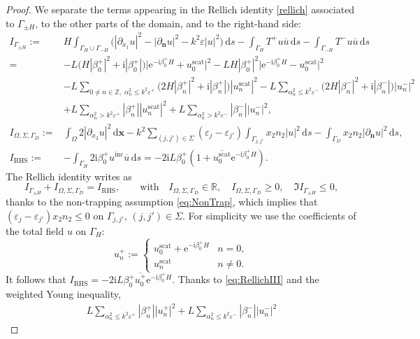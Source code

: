 \documentclass[10pt,a4paper]{amsart}
\newcommand{\IR}{{\mathbb R}}
\newcommand{\IZ}{{\mathbb Z}}
\newcommand{\bx}{{\mathbf x}}
\newcommand{\bn}{{\mathbf n}}
\newcommand{\ri}{{\mathrm i}}
\newcommand{\re}{{\mathrm e}}
\newcommand{\rd}{{\,\mathrm d}}
\newcommand{\inc}{{\mathrm{inc}}}
\newcommand{\scat}{{\mathrm{scat}}}
\newcommand{\dn}{{\partial_\bn}}
\newcommand{\dxo}{{\partial_{x_1}}}
\newcommand{\dxt}{{\partial_{x_2}}}
\newcommand{\cu}{{\overline{u}}}
\newcommand{\GD}{{\Gamma_D}}
\newcommand{\GH}{{\Gamma_H}}
\newcommand{\GmH}{{\Gamma_{-H}}}
\newcommand{\GpmH}{{\Gamma_{\pm H}}}
\begin{document}
\begin{proof}
We separate the terms appearing in the Rellich identity \eqref{rellich} associated to $\GpmH$, to the other parts of the domain, and to the right-hand side:
\begin{align*} \nonumber
	I_\GpmH := & H\int_{\GH\cup\GmH} \biggl( \left|\dxo u \right|^2 - \left| \dn u \right|^2 -k^2\varepsilon |u|^2 \biggr)\rd s -\int_{\GH} T^+ u\cu\rd s-\int_\GmH T^- u\cu\rd s
	\\ \nonumber
	=& 
	-L\Big(H|\beta_0^+|^2+\ri|\beta_0^+|\Big) \big|\re^{-\ri\beta_0^+ H}+u^\scat_0\big|^2
	- L H|\beta_0^+|^2\big|\re^{-\ri\beta_0^+ H}-u^\scat_0\big|^2\\ \nonumber
	&-L\sum_{0\ne n\in\IZ,\; \alpha_n^2\le k^2\varepsilon^+}\Big(2H|\beta_n^+|^2+\ri|\beta_n^+|\Big) |u^{\scat}_n|^2
	-L\sum_{ \alpha_n^2\le k^2\varepsilon^-}\Big(2H|\beta_n^-|^2+\ri|\beta_n^-|\Big)|u^-_n|^2\\ 
	&+L\sum_{\alpha^2_n > k^2\varepsilon^+} |\beta_n^+||u_n^{\scat}|^2
	+L\sum_{\alpha^2_n > k^2\varepsilon^-}|\beta_n^-||u_n^-|^2,
	\\
	I_{\Omega, \Sigma, \GD} :=& \int_\Omega 2|\dxt u|^2\rd\bx
	-k^2\sum_{(j,j')\in\Sigma} ( \varepsilon_{j} -\varepsilon_{j'} ) \int_{\Gamma_{j,j'}} x_2 n_2 |u|^2\rd s
	- \int_{\GD} x_2n_2|\dn u|^2 \rd s,
	\\
	I_{\mathrm{RHS}} :=& -\int_{\GH} 2 \ri \beta_0^+ {u^\inc} \cu \rd s
	=-2\ri L\beta_0^+ {(1+\overline{u_0^\scat} \re^{-\ri\beta_0^+H})}.
\end{align*}
The Rellich identity writes as 
\begin{equation}\label{eq:RellichIII}
	I_\GpmH+I_{\Omega, \Sigma, \GD}=I_{\mathrm{RHS}}, \qquad
	\text{with} \quad I_{\Omega, \Sigma, \GD}\in \IR, \quad
	I_{\Omega, \Sigma, \GD}\ge 0, \quad\Im I_\GpmH\le0, 
\end{equation}
thanks to the non-trapping assumption \eqref{eq:NonTrap}, which implies that $(\varepsilon_j-\varepsilon_{j'})x_2n_2\le0$ on $\Gamma_{j,j'}$, $(j,j')\in\Sigma$.
For simplicity we use the coefficients of the total field $u$ on $\GH$:
$$
u_n^+:=\begin{cases} u_0^\scat+\re^{-\ri\beta_0^+H}  & n=0,\\ u_n^\scat & n\ne0.\end{cases}
$$
It follows that $I_{\mathrm{RHS}}=-2\ri L\beta_0^+ \overline{u_0^+}\re^{-\ri\beta_0^+H}$.
Thanks to \eqref{eq:RellichIII} and the weighted Young inequality,
\begin{align*}
	L\sum_{\alpha_n^2\le k^2\varepsilon^+}|\beta_n^+||u^+_n|^2
	+L\sum_{\alpha_n^2\le k^2\varepsilon^-}|\beta_n^-||u^-_n|^2

\end{align*}
\end{proof}
\end{document}
